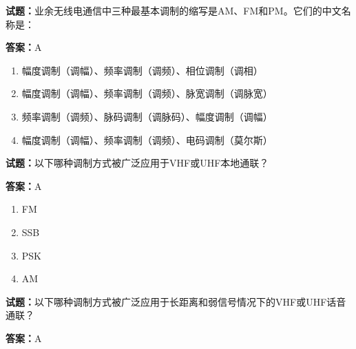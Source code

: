 \documentclass{ctexbook}
\begin{document}




\vspace{1em}

\textbf{试题：}业余无线电通信中三种最基本调制的缩写是AM、FM和PM。它们的中文名称是： 

\textbf{答案：}A 

\begin{enumerate}[leftmargin=3em]
  \item 幅度调制（调幅）、频率调制（调频）、相位调制（调相） 

  \item 幅度调制（调幅）、频率调制（调频）、脉宽调制（调脉宽） 

  \item 频率调制（调频）、脉码调制（调脉码）、幅度调制（调幅） 

  \item 幅度调制（调幅）、频率调制（调频）、电码调制（莫尔斯） 

\end{enumerate}





\vspace{1em}

\textbf{试题：}以下哪种调制方式被广泛应用于VHF或UHF本地通联？ 

\textbf{答案：}A 

\begin{enumerate}[leftmargin=3em]
  \item FM 

  \item SSB 

  \item PSK 

  \item AM 

\end{enumerate}





\vspace{1em}

\textbf{试题：}以下哪种调制方式被广泛应用于长距离和弱信号情况下的VHF或UHF话音通联？ 

\textbf{答案：}A 
\end{document}

